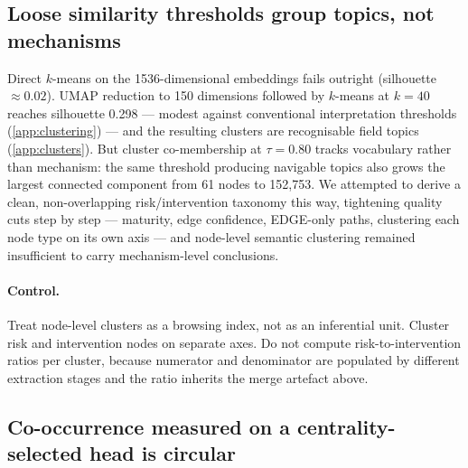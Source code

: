 \documentclass[10pt,twocolumn,letterpaper]{article}
\begin{document}
\subsection{Loose similarity thresholds group topics, not mechanisms}

Direct $k$-means on the 1536-dimensional embeddings fails outright (silhouette
$\approx 0.02$). UMAP reduction to 150 dimensions followed by $k$-means at
$k{=}40$ reaches silhouette 0.298 --- modest against conventional interpretation
thresholds \citep{kaufman1990finding} (\cref{app:clustering}) --- and the
resulting clusters are recognisable field topics (\cref{app:clusters}). But
cluster co-membership at $\tau{=}0.80$ tracks vocabulary rather than mechanism:
the same threshold producing navigable topics also grows the largest connected
component from 61 nodes to 152{,}753. We attempted to derive a clean,
non-overlapping risk/intervention taxonomy this way, tightening quality cuts step
by step --- maturity, edge confidence, EDGE-only paths, clustering each node type
on its own axis --- and node-level semantic clustering remained insufficient to
carry mechanism-level conclusions.

\paragraph{Control.} Treat node-level clusters as a browsing index, not as an
inferential unit. Cluster risk and intervention nodes on separate axes. Do not
compute risk-to-intervention ratios per cluster, because numerator and
denominator are populated by different extraction stages and the ratio inherits
the merge artefact above.

\subsection{Co-occurrence measured on a centrality-selected head is circular}
\end{document}
